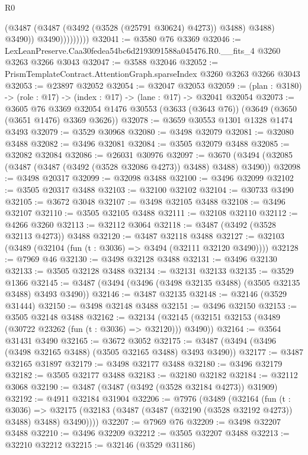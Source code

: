 \begin{lexlean}{R0}
\begin{coremodule}
                          (@3487 (@3487 (@3492 (@3528 (@25791 @30624) @4273)) @3488) @3488)
                          @3490))
                      @3490)))))))))
@32041 := @3580 @76 @3369
@32046 := LexLeanPreserve.Caa30fedea54bc6d2193091588a045476.R0.__fits_4 @3260 @3263 @3266 @3043
@32047 := @3588 @32046
@32052 := PrismTemplateContract.AttentionGraph.sparseIndex @3260 @3263 @3266 @3043
@32053 := @23897 @32052
@32054 := @32047 @32053
@32059 := (plan : @3180) -> (role : @17) -> (index : @17) -> (lane : @17) -> @32041 @32054
@32073 := @3605
    @76
    @3369
    @32054
    @1476
    @30553
    (@3633 (@3643 @76))
    (@3649 (@3650 (@3651 @1476) @3369 @3626))
@32078 := @3659 @30553 @1301 @1328 @1474 @3493
@32079 := @3529 @30968
@32080 := @3498 @32079
@32081 := @32080 @3488
@32082 := @3496 @32081
@32084 := @3505 @32079 @3488
@32085 := @32082 @32084
@32086 := @26031 @30976
@32097 := @3670 (@3494 (@32085 (@3487 (@3487 (@3492 (@3528 @32086 @4273)) @3488) @3488) @3490))
@32098 := @3498 @20317
@32099 := @32098 @3488
@32100 := @3496 @32099
@32102 := @3505 @20317 @3488
@32103 := @32100 @32102
@32104 := @30733 @3490
@32105 := @3672 @3048
@32107 := @3498 @32105 @3488
@32108 := @3496 @32107
@32110 := @3505 @32105 @3488
@32111 := @32108 @32110
@32112 := @4266 @3260
@32113 := @32112 @3064
@32118 := @3487 (@3492 (@3528 @32113 @4273)) @3488
@32120 := @3487 @32118 @3488
@32127 := @32103 (@3489 (@32104 (fun (t : @3036) => @3494 (@32111 @32120 @3490))))
@32128 := @7969 @46
@32130 := @3498 @32128 @3488
@32131 := @3496 @32130
@32133 := @3505 @32128 @3488
@32134 := @32131 @32133
@32135 := @3529 @1366
@32145 := @3487 (@3494 (@3496 (@3498 @32135 @3488) (@3505 @32135 @3488) @3493 @3490))
@32146 := @3487 @32135
@32148 := @32146 (@3529 @31444)
@32150 := @3498 @32148 @3488
@32151 := @3496 @32150
@32153 := @3505 @32148 @3488
@32162 := @32134 (@32145 (@32151 @32153 (@3489 (@30722 @23262 (fun (t : @3036) => @32120))) @3490))
@32164 := @3564 @31431 @3490
@32165 := @3672 @3052
@32175 := @3487 (@3494 (@3496 (@3498 @32165 @3488) (@3505 @32165 @3488) @3493 @3490))
@32177 := @3487 @32165 @31897
@32179 := @3498 @32177 @3488
@32180 := @3496 @32179
@32182 := @3505 @32177 @3488
@32183 := @32180 @32182
@32184 := @32112 @3068
@32190 := @3487 (@3487 (@3492 (@3528 @32184 @4273)) @31909)
@32192 := @4911 @32184 @31904
@32206 := @7976
    (@3489
      (@32164
        (fun (t : @3036) =>
        @32175 (@32183 (@3487 (@3487 (@32190 (@3528 @32192 @4273)) @3488) @3488) @3490))))
@32207 := @7969 @76
@32209 := @3498 @32207 @3488
@32210 := @3496 @32209
@32212 := @3505 @32207 @3488
@32213 := @32210 @32212
@32215 := @32146 (@3529 @31186)

\end{coremodule}
\end{lexlean}
